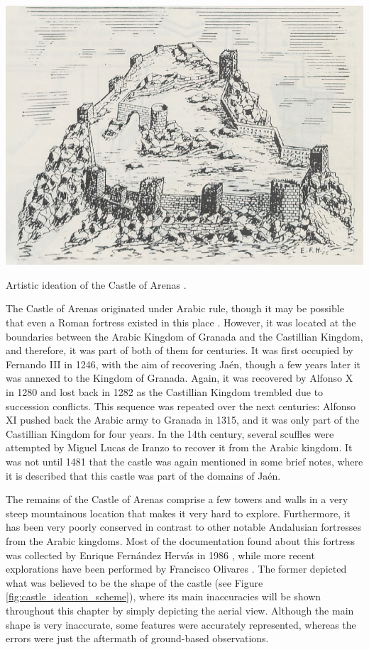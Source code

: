 \begin{marginfigure}[0.2cm]
    \centering
    \includegraphics[width=\linewidth]{figs/castle_puerta_arenas/castle_ideation.PNG}
    \caption{Artistic ideation of the Castle of Arenas \cite{fernandez_hervas_castillo_1986}.}
    \label{fig:castle_ideation_art}
\end{marginfigure}
The Castle of Arenas originated under Arabic rule, though it may be possible that even a Roman fortress existed in this place \cite{fernandez_hervas_castillo_1986}. However, it was located at the boundaries between the Arabic Kingdom of Granada and the Castillian Kingdom, and therefore, it was part of both of them for centuries. It was first occupied by Fernando III in 1246, with the aim of recovering Jaén, though a few years later it was annexed to the Kingdom of Granada. Again, it was recovered by Alfonso X in 1280 and lost back in 1282 as the Castillian Kingdom trembled due to succession conflicts. This sequence was repeated over the next centuries: Alfonso XI pushed back the Arabic army to Granada in 1315, and it was only part of the Castillian Kingdom for four years. In the 14th century, several scuffles were attempted by Miguel Lucas de Iranzo to recover it from the Arabic kingdom. It was not until 1481 that the castle was again mentioned in some brief notes, where it is described that this castle was part of the domains of Jaén.

The remains of the Castle of Arenas comprise a few towers and walls in a very steep mountainous location that makes it very hard to explore. Furthermore, it has been very poorly conserved in contrast to other notable Andalusian fortresses from the Arabic kingdoms. Most of the documentation found about this fortress was collected by Enrique Fernández Hervás in 1986 \cite{fernandez_hervas_castillo_1986}, while more recent explorations have been performed by Francisco Olivares \cite{olivares_castillos_1992}. The former depicted what was believed to be the shape of the castle (see Figure \ref{fig:castle_ideation_scheme}), where its main inaccuracies will be shown throughout this chapter by simply depicting the aerial view. Although the main shape is very inaccurate, some features were accurately represented, whereas the errors were just the aftermath of ground-based observations.

